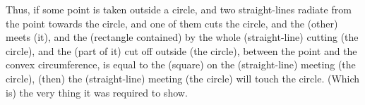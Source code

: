 \begin{Parallel}{}{}
{Thus, if some point is taken outside a circle, and two straight-lines radiate
from the point towards the circle, and one of them cuts the circle, and the
(other) meets (it), and the (rectangle contained) by the whole (straight-line)
cutting (the circle), and the (part of it) 
cut off outside (the circle),
between the point and the convex circumference,  is equal to the (square)
on the (straight-line) meeting (the circle), (then) the (straight-line)
meeting (the circle) will touch the circle. (Which is) the very thing it was
required to show.}
\end{Parallel}

\newpage~\thispagestyle{empty}
